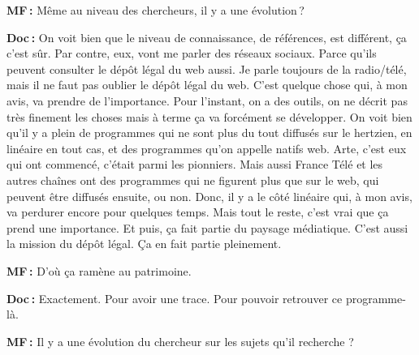 \textbf{MF :} Même au niveau des chercheurs, il y a une évolution ?   

\textbf{Doc :} On voit bien que le niveau de connaissance, de références, est différent, ça c'est sûr. Par contre, eux, vont me parler des réseaux sociaux. Parce qu'ils peuvent consulter le dépôt légal du web aussi. Je parle toujours de la radio/télé, mais il ne faut pas oublier le dépôt légal du web. C'est quelque chose qui, à mon avis, va prendre de l'importance.  Pour l'instant, on a des outils, on ne décrit pas très finement les choses mais à terme ça va forcément se développer. On voit bien qu'il y a plein de programmes qui ne sont plus du tout diffusés sur le hertzien, en linéaire en tout cas, et des programmes qu'on appelle natifs web. Arte, c'est eux qui ont commencé, c'était parmi les pionniers. Mais aussi France Télé et les autres chaînes ont des programmes qui ne figurent plus que sur le web, qui peuvent être diffusés ensuite, ou non. Donc, il y a le côté linéaire qui, à mon avis, va perdurer encore pour quelques temps. Mais tout le reste, c'est vrai que ça prend une importance. Et puis, ça fait partie du paysage médiatique. C’est aussi la mission du dépôt légal. Ça en fait partie pleinement.

\textbf{MF :} D'où ça ramène au patrimoine. 

\textbf{Doc :} Exactement. Pour avoir une trace. Pour pouvoir retrouver ce programme-là. 

\textbf{MF :} Il y a une évolution du chercheur sur les sujets qu'il recherche ?  

